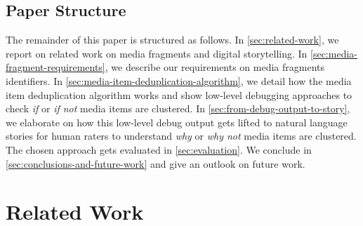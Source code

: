 \documentclass{article}
\begin{document}
\subsection{Paper Structure}
\label{sec:paper-structure}

The remainder of this paper is structured as follows.
In \autoref{sec:related-work}, we report on related work
on media fragments and digital storytelling.
In \autoref{sec:media-fragment-requirements}, we describe
our requirements on media fragments identifiers.
In \autoref{sec:media-item-deduplication-algorithm},
we detail how the media item deduplication algorithm works
and show low-level debugging approaches to check
\emph{if} or \emph{if not} media items are clustered.
In \autoref{sec:from-debug-output-to-story},
we elaborate on how this low-level debug output gets lifted
to natural language stories for human raters to understand
\emph{why} or \emph{why not} media items are clustered.
The chosen approach gets evaluated in \autoref{sec:evaluation}.
We conclude in \autoref{sec:conclusions-and-future-work}
and give an outlook on future work.

\section{Related Work}
\label{sec:related-work}
\end{document}
